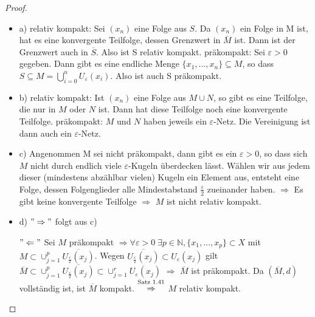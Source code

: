 \documentclass[ngerman]{report}
\theoremstyle{plain}%
\theoremstyle{definition}%
\theoremstyle{myStyle}
\newcommand{\N}{\mathbb{N}}
\newcommand{\df}[1][]{%
	\overset{#1}{\Rightarrow}
}
\newcommand{\qmarks}[1]{"#1"}
\begin{document}
	\begin{proof}
		\begin{itemize}[]

			\item a) relativ kompakt: Sei $(x_n)$ eine Folge aus $S$. Da $(x_n)$ ein Folge in M ist, hat es eine konvergente Teilfolge, dessen Grenzwert in $\overline{M}$ ist. Dann ist der Grenzwert auch in $\overline{S}$. Also ist S relativ kompakt. 
				präkompakt: Sei $\varepsilon>0$ gegeben. Dann gibt es eine endliche Menge $\{x_1,\dots,x_n\}\subseteq M$, so dass $S\subseteq M = \bigcup^n_{i=0}U_\varepsilon(x_i)$. Also ist auch S präkompakt.
			
			\item b) relativ kompakt: Ist $(x_n)$ eine Folge aus $M\cup N$, so gibt es eine Teilfolge, die nur in $M$ oder $N$ ist. Dann hat diese Teilfolge noch eine konvergente Teilfolge.
				präkompakt: $M$ und $N$ haben jeweils ein $\varepsilon$-Netz. Die Vereinigung ist dann auch ein $\varepsilon$-Netz.
				
			\item c) Angenommen M sei nicht präkompakt, dann gibt es ein $\varepsilon>0$, so dass sich $M$ nicht durch endlich viele $\varepsilon$-Kugeln überdecken lässt. Wählen wir aus jedem dieser  (mindestens abzählbar vielen) Kugeln ein Element aus, entsteht eine Folge, dessen Folgenglieder alle Mindestabstand $\frac{\varepsilon}{2}$ zueinander haben. $\df$ Es gibt keine konvergente Teilfolge $\df$ $M$ ist nicht relativ kompakt.
			
			\item d) $\qmarks{\df}$ folgt aus c) \par
				$\qmarks{\Leftarrow}$ Sei $M$ präkompakt $\df \forall \varepsilon > 0\; \exists p\in\N, \{x_1,\dots,x_p\} \subset X$ mit $M \subset \cup_{j=1}^p \overline{ U_{\frac{\varepsilon}{2}}(x_j)}$. 
				Wegen $\overline{U_{\frac{\varepsilon}{2}}(x_j)} \subset U_{{\varepsilon}}(x_j)$ gilt
				$\overline{M} \subset \cup_{j=1}^p \overline{U_{\frac{\varepsilon}{2}}(x_j)} \subset \cup_{j=1}^r U_{\varepsilon}(x_j)$
				$\df$ $\overline{M}$ ist präkompakt. Da $(\overline{M},d)$ vollständig ist, ist $\overline{M}$ kompakt. $\overset{\text{Satz 1.41}}{\df}$ $M$ relativ kompakt.
		\end{itemize}
	\end{proof}
\end{document}
